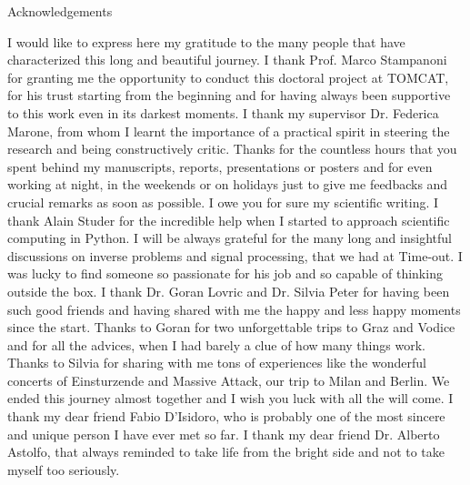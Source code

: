 {
\begin{center}
	{\fontsize{20}{2}\selectfont \textcolor{darkcerulean}{Acknowledgements}}
\end{center}
\color{black}
I would like to express here my gratitude to the many people that have characterized this long and beautiful journey. 
\newline\newline
I thank Prof. Marco Stampanoni for granting me the opportunity to conduct this doctoral project
at TOMCAT, for his trust starting from the beginning and for having always been supportive to this work even in its darkest moments.
\newline\newline
I thank my supervisor Dr. Federica Marone, from whom I learnt the importance of a practical spirit in steering the research
and being constructively critic. Thanks for the countless hours that you spent behind my manuscripts, reports, presentations or posters
and for even working at night, in the weekends or on holidays just to give me feedbacks and crucial remarks as soon as possible.
I owe you for sure my scientific writing.
\newline\newline
I thank Alain Studer for the incredible help when I started to approach scientific computing in Python. I will be always grateful
for the many long and insightful discussions on inverse problems and signal processing, that we had at Time-out. I was lucky to find
someone so passionate for his job and so capable of thinking outside the box.
\newline\newline
I thank Dr. Goran Lovric and Dr. Silvia Peter for having been such good friends and having shared with me the happy and less happy moments
since the start. Thanks to Goran for two unforgettable trips to Graz and Vodice and
for all the advices, when I had barely a clue of how many things work. Thanks to Silvia for sharing with me tons of experiences like 
the wonderful concerts of Einsturzende and Massive Attack, our trip to Milan and Berlin. We ended this journey almost together and I wish
you luck with all the will come.
\newline\newline
I thank my dear friend Fabio D'Isidoro, who is probably one of the most sincere and unique person I have ever met so far.  
\newline\newline
I thank my dear friend Dr. Alberto Astolfo, that always reminded to take life from the bright side and not to take myself too seriously.
}
